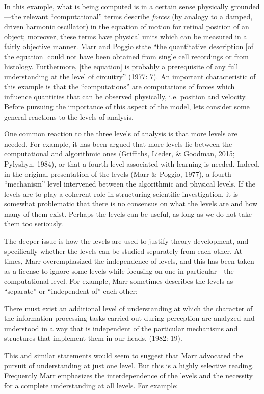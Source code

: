 In this example, what is being computed is in a certain sense physically grounded—the relevant “computational” terms describe \textit{forces} (by analogy to a damped, driven harmonic oscillator) in the equation of motion for retinal position of an object; moreover, these terms have physical units which can be measured in a fairly objective manner. Marr and Poggio state “the quantitative description [of the equation] could not have been obtained from single cell recordings or from histology. Furthermore, [the equation] is probably a prerequisite of any full understanding at the level of circuitry” (1977: 7). An important characteristic of this example is that the “computations” are computations of forces which influence quantities that can be observed physically, i.e. position and velocity. Before pursuing the importance of this aspect of the model, lets consider some general reactions to the levels of analysis.

One common reaction to the three levels of analysis is that more levels are needed. For example, it has been argued that more levels lie between the computational and algorithmic ones (Griffiths, Lieder, \& Goodman, 2015; Pylyshyn, 1984), or that a fourth level associated with learning is needed. Indeed, in the original presentation of the levels (Marr \& Poggio, 1977), a fourth “mechanism” level intervened between the algorithmic and physical levels. If the levels are to play a coherent role in structuring scientific investigation, it is somewhat problematic that there is no consensus on what the levels are and how many of them exist. Perhaps the levels can be useful, as long as we do not take them too seriously.

The deeper issue is how the levels are used to justify theory development, and specifically whether the levels can be studied separately from each other. At times, Marr overemphasized the independence of levels, and this has been taken as a license to ignore some levels while focusing on one in particular—the computational level. For example, Marr sometimes describes the levels as “separate” or “independent of” each other:

There must exist an additional level of understanding at which the character of the information-processing tasks carried out during perception are analyzed and understood in a way that is independent of the particular mechanisms and structures that implement them in our heads. (1982: 19).

This and similar statements would seem to suggest that Marr advocated the pursuit of understanding at just one level. But this is a highly selective reading. Frequently Marr emphasizes the interdependence of the levels and the necessity for a complete understanding at all levels. For example:

